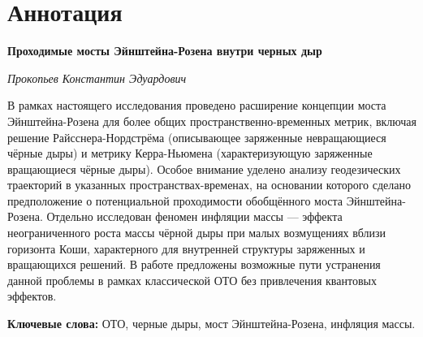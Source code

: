 \chapter*{Аннотация}\label{abstract}

\begin{center}
	\textbf{Проходимые мосты Эйнштейна-Розена внутри черных дыр}
	
	\textit{Прокопьев Константин Эдуардович}
\end{center}

В рамках настоящего исследования проведено расширение концепции моста Эйнштейна-Розена для более общих пространственно-временных метрик, включая решение Райсснера-Нордстрёма (описывающее заряженные невращающиеся чёрные дыры) и метрику Керра-Ньюмена (характеризующую заряженные вращающиеся чёрные дыры). Особое внимание уделено анализу геодезических траекторий в указанных пространствах-временах, на основании которого сделано предположение о потенциальной проходимости обобщённого моста Эйнштейна-Розена. Отдельно исследован феномен инфляции массы — эффекта неограниченного роста массы чёрной дыры при малых возмущениях вблизи горизонта Коши, характерного для внутренней структуры заряженных и вращающихся решений. В работе предложены возможные пути устранения данной проблемы в рамках классической ОТО без привлечения квантовых эффектов.

\textbf{Ключевые слова:} ОТО, черные дыры, мост Эйнштейна-Розена, инфляция массы.

\newpage
